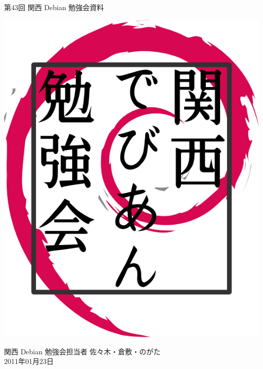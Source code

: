 \documentclass[mingoth,a4paper]{jsarticle}
\newcommand{\debmtgyear}{2011}
\newcommand{\debmtgdate}{23}
\newcommand{\debmtgmonth}{01}
\newcommand{\debmtgnumber}{43}
\begin{document}
\begin{titlepage}


 第\debmtgnumber{}回 関西 Debian 勉強会資料

\vspace{2cm}

\begin{center}
\includegraphics{image200802/kansaidebianlogo.png}
\end{center}

\begin{flushright}
\hfill{}関西 Debian 勉強会担当者 佐々木・倉敷・のがた \\
\hfill{}\debmtgyear{}年\debmtgmonth{}月\debmtgdate{}日
\end{flushright}

\thispagestyle{empty}
\end{titlepage}


\subsection*{}%
\end{document}
